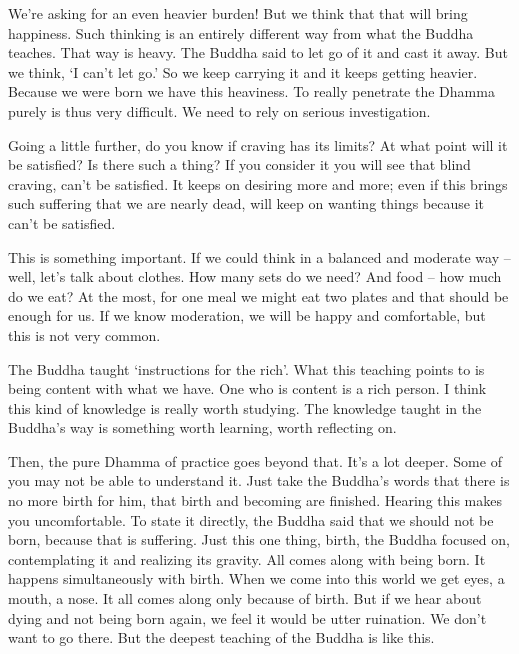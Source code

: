 We're asking for an even heavier burden! But we think that that will bring happiness. Such thinking is an entirely different way from what the Buddha teaches. That way is heavy. The Buddha said to let go of it and cast it away. But we think, `I can't let go.' So we keep carrying it and it keeps getting heavier. Because we were born we have this heaviness. To really penetrate the Dhamma purely is thus very difficult. We need to rely on serious investigation. 

Going a little further, do you know if craving has its limits? At what point will it be satisfied? Is there such a thing? If you consider it you will see that  blind craving, can't be satisfied. It keeps on desiring more and more; even if this brings such suffering that we are nearly dead,  will keep on wanting things because it can't be satisfied. 

This is something important. If we could think in a balanced and moderate way -- well, let's talk about clothes. How many sets do we need? And food -- how much do we eat? At the most, for one meal we might eat two plates and that should be  enough for us. If we know moderation, we will be happy and comfortable, but this is not very common. 

The Buddha taught `instructions for the rich'. What this teaching points to is being content with what we have. One who is content is a rich person. I think this kind of knowledge is really worth studying. The knowledge taught in the Buddha's way is something worth learning, worth reflecting on. 

Then, the pure Dhamma of practice goes beyond that. It's a lot deeper. Some of you may not be able to understand it. Just take the Buddha's words that there is no more birth for him, that birth and becoming are finished. Hearing this makes you uncomfortable. To state it directly, the Buddha said that we should not be born, because that is suffering. Just this one thing, birth, the Buddha focused on, contemplating it and realizing its gravity. All  comes along with being born. It happens simultaneously with birth. When we come into this world we get eyes, a mouth, a nose. It all comes along only because of birth. But if we hear about dying and not being born again, we feel it would be utter ruination. We don't want to go there. But the deepest teaching of the Buddha is like this. 

